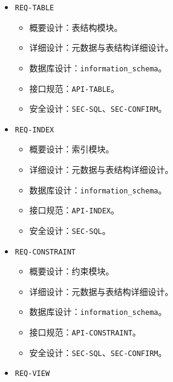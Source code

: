 \documentclass[
  a4paper,
  UTF8]{ctexart}
\providecommand{\tightlist}{%
  \setlength{\itemsep}{0pt}\setlength{\parskip}{0pt}}
\begin{document}
\begin{itemize}
  \begin{itemize}
  \tightlist
  \item
    概要设计：数据库模块。
  \item
    详细设计：数据库管理详细设计。
  \item
    数据库设计：\texttt{user\_databases}。
  \item
    接口规范：\texttt{API-DB}。
  \item
    安全设计：\texttt{SEC-AUTHZ}、\texttt{SEC-SQL}。
  \end{itemize}
\item
  \texttt{REQ-TABLE}

  \begin{itemize}
  \tightlist
  \item
    概要设计：表结构模块。
  \item
    详细设计：元数据与表结构详细设计。
  \item
    数据库设计：\texttt{information\_schema}。
  \item
    接口规范：\texttt{API-TABLE}。
  \item
    安全设计：\texttt{SEC-SQL}、\texttt{SEC-CONFIRM}。
  \end{itemize}
\item
  \texttt{REQ-INDEX}

  \begin{itemize}
  \tightlist
  \item
    概要设计：索引模块。
  \item
    详细设计：元数据与表结构详细设计。
  \item
    数据库设计：\texttt{information\_schema}。
  \item
    接口规范：\texttt{API-INDEX}。
  \item
    安全设计：\texttt{SEC-SQL}。
  \end{itemize}
\item
  \texttt{REQ-CONSTRAINT}

  \begin{itemize}
  \tightlist
  \item
    概要设计：约束模块。
  \item
    详细设计：元数据与表结构详细设计。
  \item
    数据库设计：\texttt{information\_schema}。
  \item
    接口规范：\texttt{API-CONSTRAINT}。
  \item
    安全设计：\texttt{SEC-SQL}、\texttt{SEC-CONFIRM}。
  \end{itemize}
\item
  \texttt{REQ-VIEW}


\end{itemize}
\end{document}
